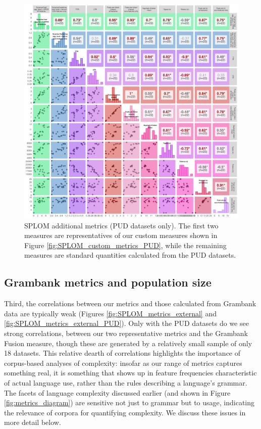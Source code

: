 \documentclass[USenglish]{article}
\begin{document}
\begin{figure}
    \centering
        \includegraphics[width=1\linewidth]{latex/graphics/SPLOM_other_metrics_PUD.png}
    \caption{SPLOM additional metrics (PUD datasets only). The first two measures are representatives of our custom measures shown in Figure \ref{fig:SPLOM_custom_metrics_PUD}, while the remaining measures are standard quantities calculated from the PUD datasets.}
    \label{fig:SPLOM_other_metrics_PUD}
\end{figure}

\subsection{Grambank metrics and population size}
Third, the correlations between our metrics and those calculated from Grambank data are typically weak (Figures \ref{fig:SPLOM_metrics_external} and \ref{fig:SPLOM_metrics_external_PUD}).
Only with the PUD datasets do we see strong correlations, between our two representative metrics and the Grambank Fusion measure, though these are generated by a relatively small sample of only 18 datasets.
This relative dearth of correlations highlights the importance of corpus-based analyses of complexity: insofar as our range of metrics captures something real, it is something that shows up in feature frequencies characteristic of actual language use, rather than the rules describing a language's grammar.
The facets of language complexity discussed earlier (and shown in Figure \ref{fig:metrics_diagram}) are sensitive not just to grammar but to usage, indicating the relevance of corpora for quantifying complexity.
We discuss these issues in more detail below.
\end{document}
